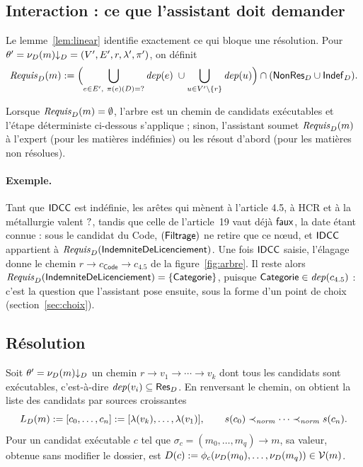 \documentclass[review]{jflart}
\newcommand{\Categorie}{\ensuremath{\mathsf{Categorie}}}
\renewcommand{\Indem}{\ensuremath{\mathsf{IndemniteDeLicenciement}}}
\begin{document}
\subsection{Interaction : ce que l'assistant doit demander}

Le lemme~\ref{lem:linear} identifie exactement ce qui bloque une résolution.
Pour \(\theta'={\nu_D(m)}{\downarrow_D}=(V',E',r,\lambda',\pi')\), on définit
\[
 \NeedFacts_D(m):=\Bigl(\bigcup_{e\in E',\ \pi(e)(D)=\unknown}\dep(e)
   \;\cup\bigcup_{u\in V'\setminus\{r\}}\dep(u)\Bigr)
   \cap(\Unres\cup\Undef).
\]

Lorsque \(\mathit{Requis}_D(m)=\emptyset\), l'arbre est un chemin de candidats
exécutables et l'étape déterministe ci-dessous s'applique ; sinon, l'assistant
soumet \(\mathit{Requis}_D(m)\) à l'expert (pour les matières indéfinies) ou les
résout d'abord (pour les matières non résolues).

\paragraph{Exemple.} Tant que \(\mathsf{IDCC}\) est indéfinie, les arêtes qui mènent à
l'article 4.5, à HCR et à la métallurgie valent \(\mathord{?}\), tandis que celle
de l'article~19 vaut déjà \(\mathsf{faux}\), la date étant connue : sous le candidat du Code,
\((\mathsf{Filtrage})\) ne retire que ce nœud, et \(\mathsf{IDCC}\) appartient à
\(\NeedFacts_D(\Indem)\). Une fois \(\mathsf{IDCC}\)
saisie, l'élagage donne le chemin \(r\to c_{\mathsf{Code}}\to c_{4.5}\) de la
figure~\ref{fig:arbre}. Il reste alors \(\NeedFacts_D(\Indem)=\{\Categorie\}\),
puisque \(\Categorie\in\dep(c_{4.5})\) : c'est la question que l'assistant
pose ensuite, sous la forme d'un point de choix (section~\ref{sec:choix}).

\subsection{Résolution}\label{sec:resolution}

Soit \(\theta'={\nu_D(m)}{\downarrow_D}\) un chemin \(r\to v_1\to\cdots\to v_k\) dont tous
les candidats sont exécutables, c'est-à-dire \(\mathit{dep}(v_i)\subseteq\mathsf{Res}_D\). En
renversant le chemin, on obtient la liste des candidats par sources croissantes
\[
 L_D(m):=[c_0,\ldots,c_n]:=[\lambda(v_k),\ldots,\lambda(v_1)],\qquad
 s(c_0)\prec_{\mathit{norm}}\cdots\prec_{\mathit{norm}} s(c_n).
\]
Pour un candidat exécutable \(c\) tel que \(\sigma_c=(m_0,\ldots,m_q)\to m\),
sa valeur, obtenue sans modifier le dossier, est
\(D(c):=\phi_c(\nu_D(m_0),\ldots,\nu_D(m_q))\in\mathcal{V}(m)\).
\end{document}
